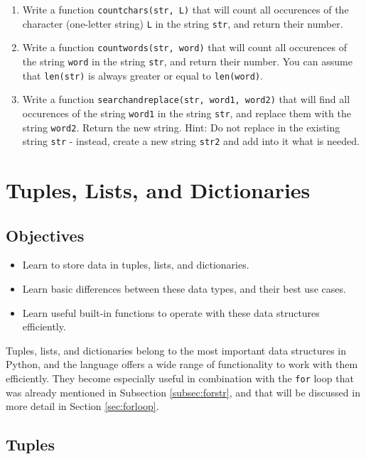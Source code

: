 \begin{enumerate}
\item Write a function {\tt countchars(str, L)} that will count 
all occurences of the character (one-letter string) {\tt L} in the string {\tt str}, 
and return their number. 
\item Write a function {\tt countwords(str, word)} that will count 
all occurences of the string {\tt word} in the string {\tt str}, and 
return their number. You can assume that {\tt len(str)} is always greater 
or equal to {\tt len(word)}.
\item Write a function {\tt searchandreplace(str, word1, word2)} that will 
find all occurences of the string {\tt word1} in the string {\tt str}, and 
replace them with the string {\tt word2}. Return the new string.
Hint: Do not replace in the existing string {\tt str} - instead, 
create a new string {\tt str2} and add into it what is needed.
\end{enumerate}



\section{Tuples, Lists, and Dictionaries}\label{sec:lists}

\subsection{Objectives}

\begin{itemize}
\item Learn to store data in tuples, lists, and dictionaries.
\item Learn basic differences between these data types, and their best use cases.
\item Learn useful built-in functions to operate with these data structures efficiently. 
\end{itemize}
Tuples, lists, and dictionaries belong to the most important data structures in Python, and the 
language offers a wide range of functionality to work with them efficiently. They become 
especially useful in combination with the {\tt for}
loop that was already mentioned in Subsection \ref{subsec:forstr}, and that will be 
discussed in more detail in Section \ref{sec:forloop}. 

\subsection{Tuples}

